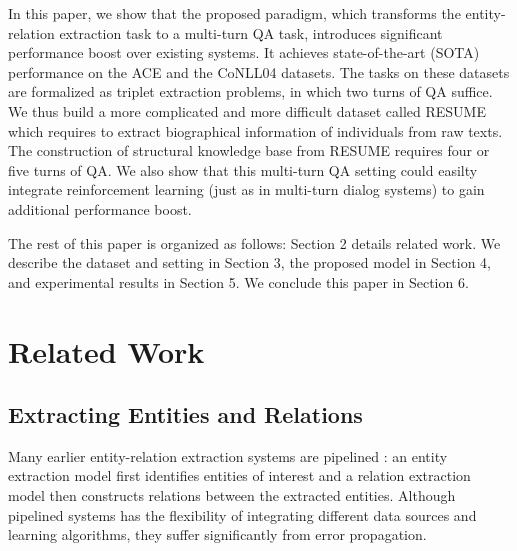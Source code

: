 \documentclass[11pt,a4paper]{article}
\begin{document}
In this paper, we show that the proposed  paradigm, which 
transforms
 the entity-relation extraction task to a multi-turn QA task,
    introduces significant performance boost over existing systems. It achieves state-of-the-art (SOTA) performance on the 
ACE and the CoNLL04 datasets.
The tasks on these datasets  are formalized as triplet extraction problems, in which two turns of QA suffice.
We thus build a more complicated and more difficult dataset called RESUME which requires to extract biographical information of individuals from raw texts. 
The construction of structural knowledge base from RESUME 
requires 
 four or five turns of QA. 
 We also show that this multi-turn QA setting could easilty integrate reinforcement learning (just as in multi-turn dialog systems) to gain additional performance boost. 
 
The rest of this paper is organized as follows: Section 2 details related work. We describe the dataset and setting in Section 3, the proposed model in Section 4, 
and experimental results in Section 5. We conclude this paper in Section 6. 
\section{Related Work}
\subsection{Extracting Entities and Relations}
Many  earlier entity-relation extraction systems are pipelined \cite{zelenko2003kernel,miwa2009rich,chan2011exploiting,lin2016neural}: an entity extraction model first identifies entities of interest and 
a relation extraction  model then constructs relations between the extracted entities. 
Although pipelined systems has the flexibility of integrating different data sources and learning algorithms, they suffer significantly from error propagation. 
\end{document}
